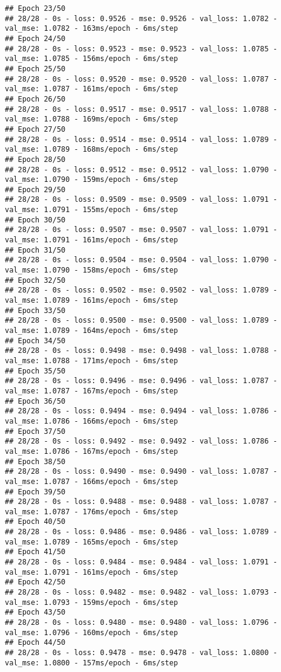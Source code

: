 \documentclass[
]{article}
\begin{document}
\begin{verbatim}
## Epoch 23/50
## 28/28 - 0s - loss: 0.9526 - mse: 0.9526 - val_loss: 1.0782 - val_mse: 1.0782 - 163ms/epoch - 6ms/step
## Epoch 24/50
## 28/28 - 0s - loss: 0.9523 - mse: 0.9523 - val_loss: 1.0785 - val_mse: 1.0785 - 156ms/epoch - 6ms/step
## Epoch 25/50
## 28/28 - 0s - loss: 0.9520 - mse: 0.9520 - val_loss: 1.0787 - val_mse: 1.0787 - 161ms/epoch - 6ms/step
## Epoch 26/50
## 28/28 - 0s - loss: 0.9517 - mse: 0.9517 - val_loss: 1.0788 - val_mse: 1.0788 - 169ms/epoch - 6ms/step
## Epoch 27/50
## 28/28 - 0s - loss: 0.9514 - mse: 0.9514 - val_loss: 1.0789 - val_mse: 1.0789 - 168ms/epoch - 6ms/step
## Epoch 28/50
## 28/28 - 0s - loss: 0.9512 - mse: 0.9512 - val_loss: 1.0790 - val_mse: 1.0790 - 159ms/epoch - 6ms/step
## Epoch 29/50
## 28/28 - 0s - loss: 0.9509 - mse: 0.9509 - val_loss: 1.0791 - val_mse: 1.0791 - 155ms/epoch - 6ms/step
## Epoch 30/50
## 28/28 - 0s - loss: 0.9507 - mse: 0.9507 - val_loss: 1.0791 - val_mse: 1.0791 - 161ms/epoch - 6ms/step
## Epoch 31/50
## 28/28 - 0s - loss: 0.9504 - mse: 0.9504 - val_loss: 1.0790 - val_mse: 1.0790 - 158ms/epoch - 6ms/step
## Epoch 32/50
## 28/28 - 0s - loss: 0.9502 - mse: 0.9502 - val_loss: 1.0789 - val_mse: 1.0789 - 161ms/epoch - 6ms/step
## Epoch 33/50
## 28/28 - 0s - loss: 0.9500 - mse: 0.9500 - val_loss: 1.0789 - val_mse: 1.0789 - 164ms/epoch - 6ms/step
## Epoch 34/50
## 28/28 - 0s - loss: 0.9498 - mse: 0.9498 - val_loss: 1.0788 - val_mse: 1.0788 - 171ms/epoch - 6ms/step
## Epoch 35/50
## 28/28 - 0s - loss: 0.9496 - mse: 0.9496 - val_loss: 1.0787 - val_mse: 1.0787 - 167ms/epoch - 6ms/step
## Epoch 36/50
## 28/28 - 0s - loss: 0.9494 - mse: 0.9494 - val_loss: 1.0786 - val_mse: 1.0786 - 166ms/epoch - 6ms/step
## Epoch 37/50
## 28/28 - 0s - loss: 0.9492 - mse: 0.9492 - val_loss: 1.0786 - val_mse: 1.0786 - 167ms/epoch - 6ms/step
## Epoch 38/50
## 28/28 - 0s - loss: 0.9490 - mse: 0.9490 - val_loss: 1.0787 - val_mse: 1.0787 - 166ms/epoch - 6ms/step
## Epoch 39/50
## 28/28 - 0s - loss: 0.9488 - mse: 0.9488 - val_loss: 1.0787 - val_mse: 1.0787 - 176ms/epoch - 6ms/step
## Epoch 40/50
## 28/28 - 0s - loss: 0.9486 - mse: 0.9486 - val_loss: 1.0789 - val_mse: 1.0789 - 165ms/epoch - 6ms/step
## Epoch 41/50
## 28/28 - 0s - loss: 0.9484 - mse: 0.9484 - val_loss: 1.0791 - val_mse: 1.0791 - 161ms/epoch - 6ms/step
## Epoch 42/50
## 28/28 - 0s - loss: 0.9482 - mse: 0.9482 - val_loss: 1.0793 - val_mse: 1.0793 - 159ms/epoch - 6ms/step
## Epoch 43/50
## 28/28 - 0s - loss: 0.9480 - mse: 0.9480 - val_loss: 1.0796 - val_mse: 1.0796 - 160ms/epoch - 6ms/step
## Epoch 44/50
## 28/28 - 0s - loss: 0.9478 - mse: 0.9478 - val_loss: 1.0800 - val_mse: 1.0800 - 157ms/epoch - 6ms/step

\end{verbatim}
\end{document}
